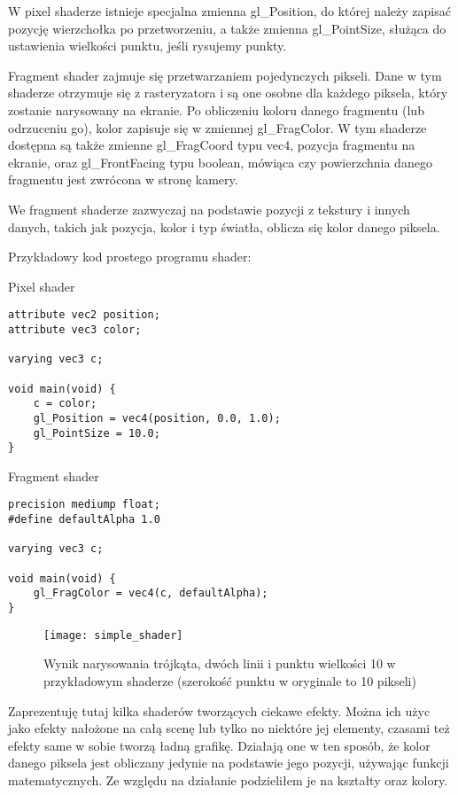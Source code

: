 W pixel shaderze istnieje specjalna zmienna gl\_Position, do której należy zapisać pozycję wierzchołka po przetworzeniu, a także zmienna gl\_PointSize, służąca do ustawienia wielko\'sci punktu, je\'sli rysujemy punkty.\bigskip

\smallskip

Fragment shader zajmuje się przetwarzaniem pojedynczych pikseli. Dane w tym shaderze otrzymuje się z rasteryzatora i są one osobne dla każdego piksela, który zostanie narysowany na ekranie. Po obliczeniu koloru danego fragmentu (lub odrzuceniu go), kolor zapisuje się w zmiennej gl\_FragColor. W tym shaderze dostępna są także zmienne gl\_FragCoord typu vec4, pozycja fragmentu na ekranie, oraz gl\_FrontFacing typu boolean, mówiąca czy powierzchnia danego fragmentu jest zwrócona w stronę kamery.

We fragment shaderze zazwyczaj na podstawie pozycji z tekstury i innych danych, takich jak pozycja, kolor i typ \'swiatła, oblicza się kolor danego piksela.\bigskip

\noindent Przykładowy kod prostego programu shader:\smallskip

{\large Pixel shader}
\begin{lstlisting}
attribute vec2 position;
attribute vec3 color;

varying vec3 c;

void main(void) {
	c = color;
	gl_Position = vec4(position, 0.0, 1.0);
	gl_PointSize = 10.0;
}
\end{lstlisting}\newpage

{\large Fragment shader}
\begin{lstlisting}
precision mediump float;
#define defaultAlpha 1.0

varying vec3 c;

void main(void) {
	gl_FragColor = vec4(c, defaultAlpha);
}
\end{lstlisting}
\begin{figure}[h]
	\centering
	\noindent\texttt{[image: simple\_shader]}
	\caption{Wynik narysowania trójkąta, dwóch linii i punktu wielko\'sci 10 w przykładowym shaderze (szeroko\'sć punktu w oryginale to 10 pikseli)}
\end{figure}\vfill

\newpage{}

Zaprezentuję tutaj kilka shaderów tworzących ciekawe efekty. Można ich użyc jako efekty nałożone na całą scenę lub tylko no niektóre jej elementy, czasami też efekty same w sobie tworzą ładną grafikę.
Działają one w ten sposób, że kolor danego piksela jest obliczany jedynie na podstawie jego pozycji, używając funkcji matematycznych. Ze względu na działanie podzieliłem je na kształty oraz kolory.\bigskip

